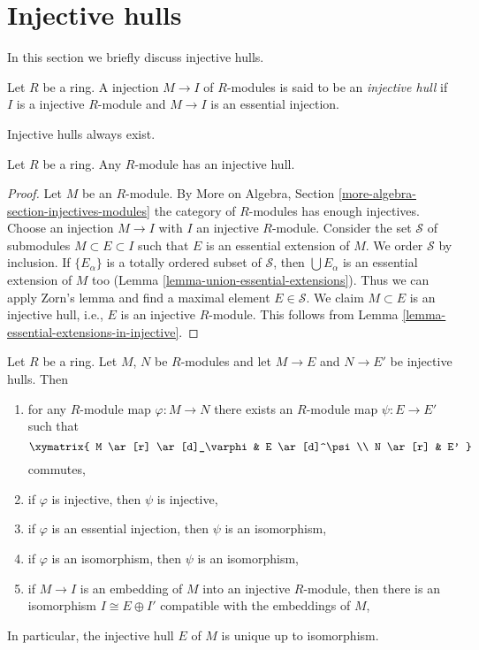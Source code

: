 \section{Injective hulls}
\label{section-injective-hull}

\noindent
In this section we briefly discuss injective hulls.

\begin{definition}
\label{definition-injective-hull}
Let $R$ be a ring. A injection $M \to I$ of $R$-modules is said
to be an {\it injective hull} if $I$ is a injective $R$-module and
$M \to I$ is an essential injection.
\end{definition}

\noindent
Injective hulls always exist.

\begin{lemma}
\label{lemma-injective-hull}
Let $R$ be a ring. Any $R$-module has an injective hull.
\end{lemma}

\begin{proof}
Let $M$ be an $R$-module. By
More on Algebra, Section \ref{more-algebra-section-injectives-modules}
the category of $R$-modules has enough injectives.
Choose an injection $M \to I$ with $I$ an injective $R$-module.
Consider the set $\mathcal{S}$ of submodules $M \subset E \subset I$
such that $E$ is an essential extension of $M$. We order $\mathcal{S}$
by inclusion. If $\{E_\alpha\}$ is a totally ordered subset
of $\mathcal{S}$, then $\bigcup E_\alpha$ is an essential extension of $M$
too (Lemma \ref{lemma-union-essential-extensions}).
Thus we can apply Zorn's lemma and find a maximal element
$E \in \mathcal{S}$. We claim $M \subset E$ is an injective hull, i.e.,
$E$ is an injective $R$-module. This follows from
Lemma \ref{lemma-essential-extensions-in-injective}.
\end{proof}

\begin{lemma}
\label{lemma-injective-hull-unique}
Let $R$ be a ring. Let $M$, $N$ be $R$-modules and let $M \to E$
and $N \to E'$ be injective hulls. Then
\begin{enumerate}
\item for any $R$-module map $\varphi : M \to N$ there exists an
$R$-module map $\psi : E \to E'$ such that
$$
\xymatrix{
M \ar[r] \ar[d]_\varphi & E \ar[d]^\psi \\
N \ar[r] & E'
}
$$
commutes,
\item if $\varphi$ is injective, then $\psi$ is injective,
\item if $\varphi$ is an essential injection, then $\psi$ is an isomorphism,
\item if $\varphi$ is an isomorphism, then $\psi$ is an isomorphism,
\item if $M \to I$ is an embedding of $M$ into an injective $R$-module,
then there is an isomorphism $I \cong E \oplus I'$ compatible with
the embeddings of $M$,
\end{enumerate}
In particular, the injective hull $E$ of $M$ is unique up to isomorphism.
\end{lemma}

